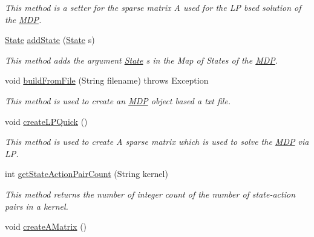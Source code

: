 \begin{DoxyCompactItemize}
\begin{DoxyCompactList}\small\item\em This method is a setter for the sparse matrix A used for the L\+P bsed solution of the \hyperlink{classese_1_1seas_1_1upenn_1_1edu_1_1_m_d_p}{M\+D\+P}. \end{DoxyCompactList}\item 
\hypertarget{classese_1_1seas_1_1upenn_1_1edu_1_1_m_d_p_a483e8c4fa59984e5b653686bc4a343c4}{}\hyperlink{classese_1_1seas_1_1upenn_1_1edu_1_1_state}{State} \hyperlink{classese_1_1seas_1_1upenn_1_1edu_1_1_m_d_p_a483e8c4fa59984e5b653686bc4a343c4}{add\+State} (\hyperlink{classese_1_1seas_1_1upenn_1_1edu_1_1_state}{State} s)\label{classese_1_1seas_1_1upenn_1_1edu_1_1_m_d_p_a483e8c4fa59984e5b653686bc4a343c4}

\begin{DoxyCompactList}\small\item\em This method adds the argument \hyperlink{classese_1_1seas_1_1upenn_1_1edu_1_1_state}{State} s in the Map of States of the \hyperlink{classese_1_1seas_1_1upenn_1_1edu_1_1_m_d_p}{M\+D\+P}. \end{DoxyCompactList}\item 
void \hyperlink{classese_1_1seas_1_1upenn_1_1edu_1_1_m_d_p_ae5da8ca2a3ae73ffc832cb4626ed2ace}{build\+From\+File} (String filename)  throws Exception 	
\begin{DoxyCompactList}\small\item\em This method is used to create an \hyperlink{classese_1_1seas_1_1upenn_1_1edu_1_1_m_d_p}{M\+D\+P} object based a txt file. \end{DoxyCompactList}\item 
void \hyperlink{classese_1_1seas_1_1upenn_1_1edu_1_1_m_d_p_a23631cbc791e50769e7c5dff9e61fe0c}{create\+L\+P\+Quick} ()
\begin{DoxyCompactList}\small\item\em This method is used to create A sparse matrix which is used to solve the \hyperlink{classese_1_1seas_1_1upenn_1_1edu_1_1_m_d_p}{M\+D\+P} via L\+P. \end{DoxyCompactList}\item 
\hypertarget{classese_1_1seas_1_1upenn_1_1edu_1_1_m_d_p_a701c0f156143fddf41c41d94b6df7bb5}{}int \hyperlink{classese_1_1seas_1_1upenn_1_1edu_1_1_m_d_p_a701c0f156143fddf41c41d94b6df7bb5}{get\+State\+Action\+Pair\+Count} (String kernel)\label{classese_1_1seas_1_1upenn_1_1edu_1_1_m_d_p_a701c0f156143fddf41c41d94b6df7bb5}

\begin{DoxyCompactList}\small\item\em This method returns the number of integer count of the number of state-\/action pairs in a kernel. \end{DoxyCompactList}\item 
\hypertarget{classese_1_1seas_1_1upenn_1_1edu_1_1_m_d_p_aa2388cc570c1221db8965bd67ebce964}{}void \hyperlink{classese_1_1seas_1_1upenn_1_1edu_1_1_m_d_p_aa2388cc570c1221db8965bd67ebce964}{create\+A\+Matrix} ()\label{classese_1_1seas_1_1upenn_1_1edu_1_1_m_d_p_aa2388cc570c1221db8965bd67ebce964}


\end{DoxyCompactItemize}
